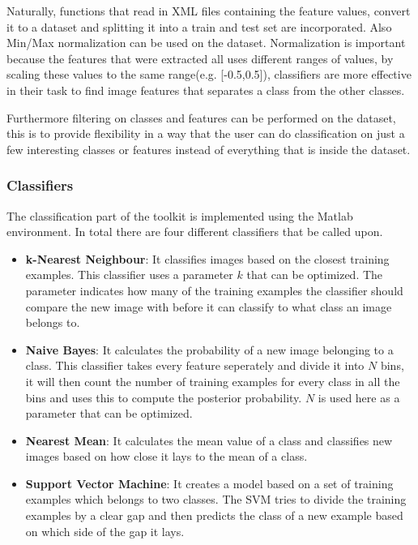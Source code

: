 Naturally, functions that read in XML files containing the feature values, convert it to a dataset and splitting it into a train and test set are incorporated.
Also Min/Max normalization can be used on the dataset.
Normalization is important because the features that were extracted all uses different ranges of values, by scaling these values to the same range(e.g. [-0.5,0.5]), classifiers are more effective in their task to find image features that separates a class from the other classes.

Furthermore filtering on classes and features can be performed on the dataset, this is to provide flexibility in a way that the user can do classification on just a few interesting classes or features instead of everything that is inside the dataset.

\subsubsection{Classifiers}
The classification part of the toolkit is implemented using the Matlab environment. In total there are four different classifiers that be called upon.

\begin{itemize}
	\item \textbf{k-Nearest Neighbour}: It classifies images based on the closest training examples.
	This classifier uses a parameter $k$ that can be optimized. 
	The parameter indicates how many of the training examples the classifier should compare the new image with before it can classify to what class an image belongs to.
	\item \textbf{Naive Bayes}: It calculates the probability of a new image belonging to a class.
	This classifier takes every feature seperately and divide it into $N$ bins, it will then count the number of training examples for every class in all the bins and uses this to compute the posterior probability.
	$N$ is used here as a parameter that can be optimized.
	\item \textbf{Nearest Mean}: It calculates the mean value of a class and classifies new images based on how close it lays to the mean of a class.
	\item \textbf{Support Vector Machine}: It creates a model based on a set of training examples which belongs to two classes.
	The SVM tries to divide the training examples by a clear gap and then predicts the class of a new example based on which side of the gap it lays.
\end{itemize}

